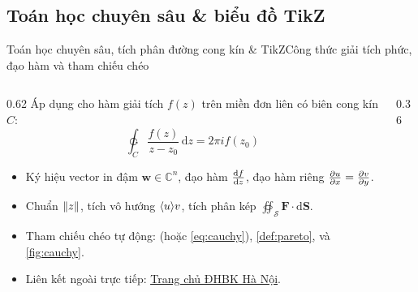 \documentclass[aspectratio=169,10pt]{beamer}
\begin{document}
\subsection{Toán học chuyên sâu \& biểu đồ TikZ}
\begin{frame}{Toán học chuyên sâu, tích phân đường cong kín \& TikZ}{Công thức giải tích phức, đạo hàm và tham chiếu chéo}
  \begin{columns}[c]
    \begin{column}{0.62\textwidth}
      Áp dụng cho hàm giải tích $f(z)$ trên miền đơn liên có biên cong kín $C$:
      \begin{equation}
        \ointctrclockwise_{C} \frac{f(z)}{z - z_0}\,\mathrm{d}z = 2\pi i f(z_0) \label{eq:cauchy}
      \end{equation}
      \begin{itemize}\setlength{\itemsep}{2pt}
        \item Ký hiệu vector in đậm $\bm{w} \in \mathbb{C}^n$, đạo hàm $\odv{f}{z}$, đạo hàm riêng $\pdv{u}{x} = \pdv{v}{y}$.
        \item Chuẩn $\lVert z\rVert$, tích vô hướng $\langle u\rangle{v}$, tích phân kép $\oiint_{\mathcal{S}} \bm{F}\cdot\mathrm{d}\bm{S}$.
        \item Tham chiếu chéo tự động:  (hoặc \eqref{eq:cauchy}), \cref{def:pareto}, và \cref{fig:cauchy}.
        \item Liên kết ngoài trực tiếp: \href{https://hust.edu.vn}{\underline{Trang chủ ĐHBK Hà Nội}}.
      \end{itemize}
    \end{column}
    \begin{column}{0.36\textwidth}
      \centering
      \vskip 2pt
      \label{fig:cauchy}
    \end{column}
  \end{columns}
\end{frame}
\end{document}
